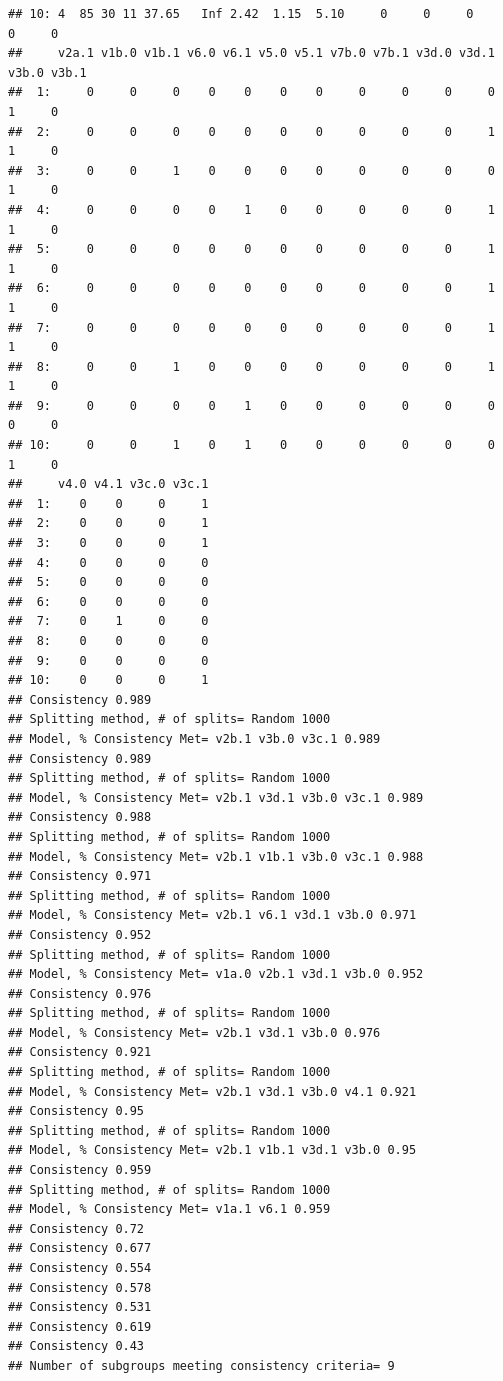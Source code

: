 \documentclass[9pt]{article}\usepackage[]{graphicx}\usepackage[]{xcolor}
\makeatletter
\newenvironment{kframe}{%
 \def\at@end@of@kframe{}%
 \ifinner\ifhmode%
  \def\at@end@of@kframe{\end{minipage}}%
  \begin{minipage}{\columnwidth}%
 \fi\fi%
 \def\FrameCommand##1{\hskip\@totalleftmargin \hskip-\fboxsep
 \colorbox{shadecolor}{##1}\hskip-\fboxsep
     \hskip-\linewidth \hskip-\@totalleftmargin \hskip\columnwidth}%
 \MakeFramed {\advance\hsize-\width
   \@totalleftmargin\z@ \linewidth\hsize
   \@setminipage}}%
 {\par\unskip\endMakeFramed%
 \at@end@of@kframe}
\newenvironment{knitrout}{}{} %
\theoremstyle{definition}
\theoremstyle{remark}
\makeatother
\begin{document}
\begin{knitrout}
\begin{kframe}
\begin{verbatim}
## 10: 4  85 30 11 37.65   Inf 2.42  1.15  5.10     0     0     0     0     0
##     v2a.1 v1b.0 v1b.1 v6.0 v6.1 v5.0 v5.1 v7b.0 v7b.1 v3d.0 v3d.1 v3b.0 v3b.1
##  1:     0     0     0    0    0    0    0     0     0     0     0     1     0
##  2:     0     0     0    0    0    0    0     0     0     0     1     1     0
##  3:     0     0     1    0    0    0    0     0     0     0     0     1     0
##  4:     0     0     0    0    1    0    0     0     0     0     1     1     0
##  5:     0     0     0    0    0    0    0     0     0     0     1     1     0
##  6:     0     0     0    0    0    0    0     0     0     0     1     1     0
##  7:     0     0     0    0    0    0    0     0     0     0     1     1     0
##  8:     0     0     1    0    0    0    0     0     0     0     1     1     0
##  9:     0     0     0    0    1    0    0     0     0     0     0     0     0
## 10:     0     0     1    0    1    0    0     0     0     0     0     1     0
##     v4.0 v4.1 v3c.0 v3c.1
##  1:    0    0     0     1
##  2:    0    0     0     1
##  3:    0    0     0     1
##  4:    0    0     0     0
##  5:    0    0     0     0
##  6:    0    0     0     0
##  7:    0    1     0     0
##  8:    0    0     0     0
##  9:    0    0     0     0
## 10:    0    0     0     1
## Consistency 0.989 
## Splitting method, # of splits= Random 1000 
## Model, % Consistency Met= v2b.1 v3b.0 v3c.1 0.989 
## Consistency 0.989 
## Splitting method, # of splits= Random 1000 
## Model, % Consistency Met= v2b.1 v3d.1 v3b.0 v3c.1 0.989 
## Consistency 0.988 
## Splitting method, # of splits= Random 1000 
## Model, % Consistency Met= v2b.1 v1b.1 v3b.0 v3c.1 0.988 
## Consistency 0.971 
## Splitting method, # of splits= Random 1000 
## Model, % Consistency Met= v2b.1 v6.1 v3d.1 v3b.0 0.971 
## Consistency 0.952 
## Splitting method, # of splits= Random 1000 
## Model, % Consistency Met= v1a.0 v2b.1 v3d.1 v3b.0 0.952 
## Consistency 0.976 
## Splitting method, # of splits= Random 1000 
## Model, % Consistency Met= v2b.1 v3d.1 v3b.0 0.976 
## Consistency 0.921 
## Splitting method, # of splits= Random 1000 
## Model, % Consistency Met= v2b.1 v3d.1 v3b.0 v4.1 0.921 
## Consistency 0.95 
## Splitting method, # of splits= Random 1000 
## Model, % Consistency Met= v2b.1 v1b.1 v3d.1 v3b.0 0.95 
## Consistency 0.959 
## Splitting method, # of splits= Random 1000 
## Model, % Consistency Met= v1a.1 v6.1 0.959 
## Consistency 0.72 
## Consistency 0.677 
## Consistency 0.554 
## Consistency 0.578 
## Consistency 0.531 
## Consistency 0.619 
## Consistency 0.43 
## Number of subgroups meeting consistency criteria= 9 

\end{verbatim}
\end{kframe}
\end{knitrout}
\end{document}
